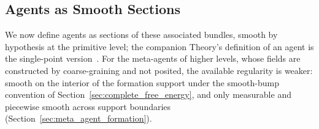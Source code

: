 \subsection{Agents as Smooth Sections}
\label{sec:agent_definition}

We now define agents as sections of these associated bundles, smooth by hypothesis at the primitive level; the companion Theory's definition of an agent is the single-point version~\cite[Ch.~2]{DennisGaugeVFE2026}. For the meta-agents of higher levels, whose fields are constructed by coarse-graining and not posited, the available regularity is weaker: smooth on the interior of the formation support under the smooth-bump convention of Section~\ref{sec:complete_free_energy}, and only measurable and piecewise smooth across support boundaries (Section~\ref{sec:meta_agent_formation}).

